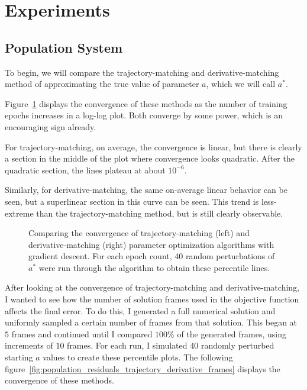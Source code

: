 \documentclass{article}
\begin{document}
\section{Experiments}
\FloatBarrier

\subsection{Population System}

To begin, we will compare the trajectory-matching and derivative-matching method of approximating the true value of parameter $a$, which we will call $a^*$.

Figure~\ref{fig:population_residuals_trajectory_derivative_epochs} displays the convergence of these methods as the number of training epochs increases in a log-log plot. Both converge by some power, which is an encouraging sign already.

For trajectory-matching, on average, the convergence is linear, but there is clearly a section in the middle of the plot where convergence looks quadratic. After the quadratic section, the lines plateau at about $10^{-6}$.

Similarly, for derivative-matching, the same on-average linear behavior can be seen, but a superlinear section in this curve can be seen. This trend is less-extreme than the trajectory-matching method, but is still clearly observable.

\begin{figure}[htpb]
    \centering
    
    \caption{Comparing the convergence of trajectory-matching (left) and derivative-matching (right) parameter optimization algorithms with gradient descent. For each epoch count, 40 random perturbations of $a^*$ were run through the algorithm to obtain these percentile lines.}
    \label{fig:population_residuals_trajectory_derivative_epochs}
\end{figure}

After looking at the convergence of trajectory-matching and derivative-matching, I wanted to see how the number of solution frames used in the objective function affects the final error. To do this, I generated a full numerical solution and uniformly sampled a certain number of frames from that solution. This began at $5$ frames and continued until I compared $100 \%$ of the generated frames, using increments of $10$ frames. For each run, I simulated $40$ randomly perturbed starting $a$ values to create these percentile plots. The following figure~\ref{fig:population_residuals_trajectory_derivative_frames} displays the convergence of these methods.
\end{document}
